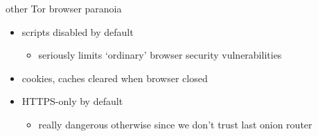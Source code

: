\begin{frame}{other Tor browser paranoia}
    \begin{itemize}
    \item scripts disabled by default
        \begin{itemize}
        \item seriously limits `ordinary' browser security vulnerabilities
        \end{itemize}
    \item cookies, caches cleared when browser closed
    \item HTTPS-only by default
        \begin{itemize}
        \item really dangerous otherwise since we don't trust last onion router
        \end{itemize}
    \end{itemize}
\end{frame}
